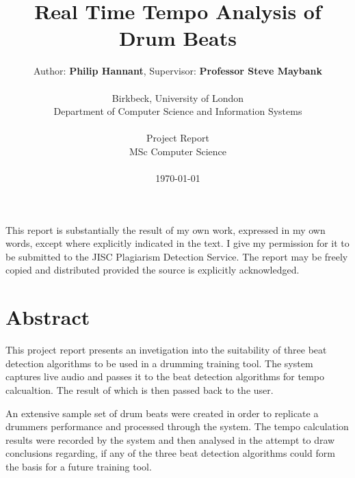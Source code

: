 \documentclass[a4paper, 11pt]{article}
\date{}
\begin{document}
 

\LARGE\title{Real Time Tempo Analysis of Drum Beats}

\LARGE\author{Author: \textbf{Philip Hannant}, Supervisor: \textbf{Professor Steve Maybank}\\
\\Birkbeck, University of London\\
Department of Computer Science and Information Systems\\
\\Project Report\\
MSc Computer Science\\
\\\monthyeardate\today\\
\vspace{60mm}
}

\normalsize
\maketitle
\section*{}
\begin{justify}
This report is substantially the result of my own work, expressed in my own words, except where explicitly indicated in the text. I give my permission for it to be submitted to the JISC Plagiarism Detection Service. The report may be freely copied and distributed provided the source is explicitly acknowledged.
\end{justify}


\clearpage
\maketitle
\section*{Abstract}
This project report presents an invetigation into the suitability of three beat detection algorithms to be used in a drumming training tool. The system captures live audio and passes it to the beat detection algorithms for tempo calcualtion. The result of which is then passed back to the user.\par

An extensive sample set of drum beats were created in order to replicate a drummers performance and processed through the system. The tempo calculation results were recorded by the system and then analysed in the attempt to draw conclusions regarding, if any of the three beat detection algorithms could form the basis for a future training tool. 
\end{document}
